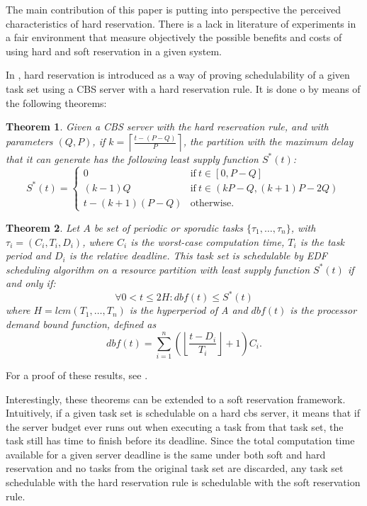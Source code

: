 \documentclass[times, 10pt,twocolumn]{article}
\newtheorem{theorem}{Theorem}[section]
\newcounter{notecounter}
\newcommand{\nota}[1]{\addtocounter{notecounter}{1}{\textcolor{red}{[nota
      \arabic{notecounter}: #1]}}}
\begin{document}
\label{sec:contr-this-paper}

The main contribution of this paper is putting into perspective the
perceived characteristics of hard reservation. There is a lack in
literature of experiments in a fair environment that measure
objectively the possible benefits and costs of using hard and soft
reservation in a given system.

\label{sec:analyt-char}

In \cite{buttazzo05:soft}, hard reservation is introduced as a way of
proving schedulability of a given task set using a CBS server with a
hard reservation rule. It is done o by means of the following theorems:

\begin{theorem}
  Given a CBS server with the hard reservation rule, and with
  parameters $(Q,P)$, if $k =
  \left\lceil\frac{t-(P-Q)}{P}\right\rceil$, the partition with the
  maximum delay that it can generate has the following least supply
  function $S^*(t)$:
  \[ S^*(t) = \left\{ \begin{array}{ll}
      0 & \text{if}\ t \in [0,P-Q] \\
      (k-1)Q & \text{if}\ t \in (kP - Q, (k+1)P-2Q) \\
      t-(k+1)(P-Q) & \text{otherwise.}
    \end{array}\right.
  \]
\end{theorem}

\begin{theorem}
  Let $A$ be set of periodic or sporadic tasks
  $\{\tau_1,\ldots,\tau_n\}$, with $\tau_i = (C_i,T_i,D_i)$, where
  $C_i$ is the worst-case computation time, $T_i$ is the task period
  and $D_i$ is the relative deadline. This task set is schedulable by
  EDF scheduling algorithm on a resource partition with least supply
  function $S^*(t)$ if and only if:
  \[
  \forall 0 < t \leq 2H : dbf(t) \leq S^*(t)
  \]
  where $H = lcm(T_1,\ldots,T_n)$ is the hyperperiod of A and $dbf(t)$
  is the processor demand bound function, defined as
  \[
  dbf(t) = \sum_{i=1}^n
  \left(\left\lfloor\frac{t-D_i}{T_i}\right\rfloor + 1\right)C_i.
  \]
\end{theorem}

For a proof of these results, see \cite{buttazzo05:soft}.

Interestingly, these theorems can be extended to a soft reservation
framework. Intuitively, if a given task set is schedulable on a hard
cbs server, it means that if the server budget ever runs out when
executing a task from that task set, the task still has time to finish
before its deadline. Since the total computation time available for a
given server deadline is the same under both soft and hard reservation
and no tasks from the original task set are discarded, any task set
schedulable with the hard reservation rule is schedulable with the
soft reservation rule. \nota{formalizar essa prova}
\end{document}
